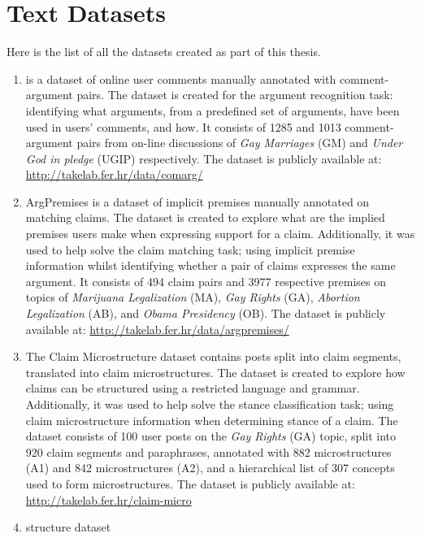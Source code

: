 \chapter{Text Datasets}
\label{chap:appendix_datasets}

Here is the list of all the datasets created as part of this thesis.

\begin{enumerate}[label=\textbf{A.\arabic*}]
\item\label{item:comarg} \ComArg is a dataset of online user comments manually annotated with
comment-argument pairs. The dataset is created for the argument
recognition task: identifying what arguments, from a predefined
set of arguments, have been used in users' comments, and how.
It consists of 1285 and 1013 comment-argument pairs from 
on-line discussions of \emph{Gay Marriages} (GM) 
and \emph{Under God in pledge} (UGIP) respectively.
The dataset is publicly available at:
\url{http://takelab.fer.hr/data/comarg/}

\item\label{item:argpresmises} ArgPremises is a dataset of 
implicit premises manually annotated on matching claims. 
The dataset is created to explore what are the implied premises users 
make when expressing support for a claim.
Additionally, it was used to help solve the claim matching task; 
using implicit premise information whilst 
identifying whether a pair of claims expresses the same argument. 
It consists of 494 claim pairs and 3977 respective premises on topics
of \emph{Marijuana Legalization} (MA), \emph{Gay Rights} (GA), 
\emph{Abortion Legalization} (AB),
and \emph{Obama Presidency} (OB).
The dataset is publicly available at:
\url{http://takelab.fer.hr/data/argpremises/}

\item\label{item:microstructures_dataset} The Claim Microstructure dataset contains posts split into claim
segments, translated into claim microstructures. The dataset is created
to explore how claims can be structured using a restricted
language and grammar. Additionally, it was used to help solve
the stance classification task; using claim microstructure
information when determining stance of a claim. 
The dataset consists of 
100 user posts on the \emph{Gay Rights} (GA) topic, 
split into 920 claim segments and paraphrases, annotated with
882 microstructures (A1) and 842 microstructures (A2), and a hierarchical 
list of 307 concepts used to form microstructures. 
The dataset is publicly available at:
\url{http://takelab.fer.hr/claim-micro}

\item structure dataset %

\end{enumerate}
